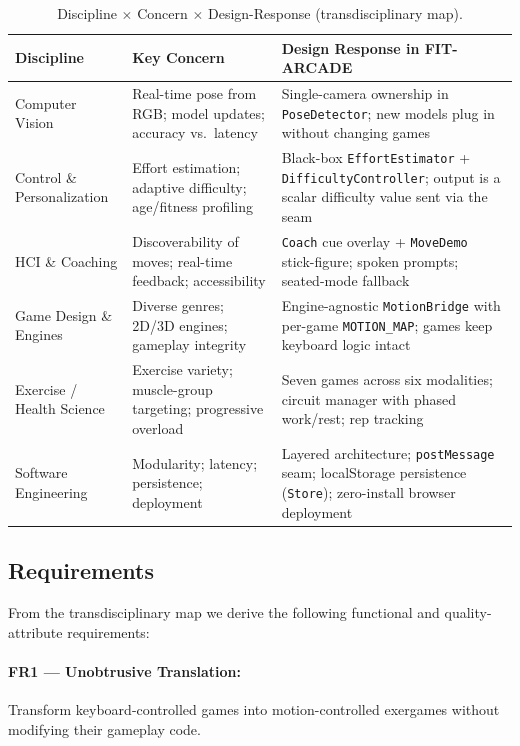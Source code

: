 \documentclass[runningheads]{llncs}
\newcommand{\sys}{\textsc{FIT-ARCADE}}
\newcommand{\motionbridge}{\texttt{MotionBridge}}
\newcommand{\motionmap}{\texttt{MOTION\_MAP}}
\newcommand{\postmsg}{\texttt{postMessage}}
\begin{document}
\begin{table}[htbp]
\centering
\caption{Discipline $\times$ Concern $\times$ Design-Response (transdisciplinary map).}
\label{tab:transmap}
\footnotesize
\begin{tabularx}{\textwidth}{@{}L{2.6cm}L{4.0cm}L{5.3cm}@{}}
\toprule
\textbf{Discipline} & \textbf{Key Concern} & \textbf{Design Response in \sys{}} \\
\midrule
Computer Vision &
  Real-time pose from RGB; model updates; accuracy vs.\ latency &
  Single-camera ownership in \texttt{PoseDetector}; new models plug in without changing games \\
\addlinespace
Control \& Personalization &
  Effort estimation; adaptive difficulty; age/fitness profiling &
  Black-box \texttt{EffortEstimator} + \texttt{DifficultyController}; output is a scalar difficulty value sent via the seam \\
\addlinespace
HCI \& Coaching &
  Discoverability of moves; real-time feedback; accessibility &
  \texttt{Coach} cue overlay + \texttt{MoveDemo} stick-figure; spoken prompts; seated-mode fallback \\
\addlinespace
Game Design \& Engines &
  Diverse genres; 2D/3D engines; gameplay integrity &
  Engine-agnostic \motionbridge{} with per-game \motionmap{}; games keep keyboard logic intact \\
\addlinespace
Exercise / Health Science &
  Exercise variety; muscle-group targeting; progressive overload &
  Seven games across six modalities; circuit manager with phased work/rest; rep tracking \\
\addlinespace
Software Engineering &
  Modularity; latency; persistence; deployment &
  Layered architecture; \postmsg{} seam; localStorage persistence (\texttt{Store}); zero-install browser deployment \\
\bottomrule
\end{tabularx}
\end{table}

\subsection{Requirements}

From the transdisciplinary map we derive the following functional and
quality-attribute requirements:

\paragraph{FR1 --- Unobtrusive Translation:} Transform keyboard-controlled games into motion-controlled exergames without modifying their gameplay code.
\end{document}
